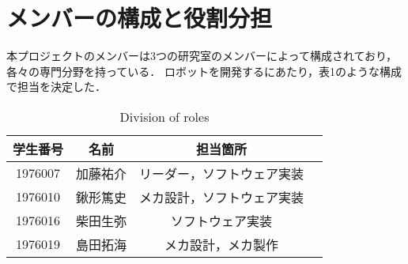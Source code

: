 \section{メンバーの構成と役割分担}
本プロジェクトのメンバーは3つの研究室のメンバーによって構成されており，各々の専門分野を持っている．
ロボットを開発するにあたり，表1のような構成で担当を決定した．
\begin{table}[htbp]
\begin{center}
\caption{Division of roles}  %
\renewcommand{\tablename}{Table}
\begin{tabular}{|c|c|c|c|}
\hline
学生番号 &名前&担当箇所 \\ \hline\hline
1976007& 加藤祐介&リーダー，ソフトウェア実装\\ \hline
1976010& 鍬形篤史&メカ設計，ソフトウェア実装\\ \hline
1976016& 柴田生弥&ソフトウェア実装\\ \hline
1976019&島田拓海&メカ設計，メカ製作\\ \hline
\end{tabular}
\label{tbl:clock}
\end{center}
\end{table}
